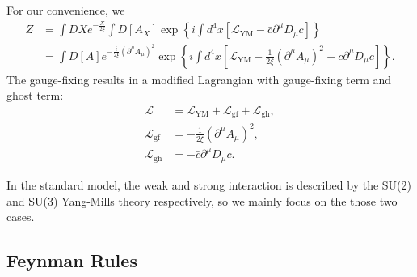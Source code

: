 \documentclass[aps,prb,superscriptaddress,nofootinbib]{revtex4}
\begin{document}
For our convenience, we 
\begin{equation}
\begin{aligned}
	Z &= \int DX e^{-\frac{X}{2 \xi}}\int D[A_X] \exp\left\{i\int d^4x \left[\mathcal{L}_{\mathrm{YM}} - \bar c\partial^\mu D_\mu c \right]\right\} \\
	&= \int D[A] e^{-\frac{i}{2\xi}(\partial^\mu A_\mu)^2} \exp\left\{i\int d^4x \left[\mathcal{L}_{\mathrm{YM}} -\frac{1}{2\xi}(\partial^\mu A_\mu)^2 - \bar c\partial^\mu D_\mu c \right]\right\}.
\end{aligned}
\end{equation}
The gauge-fixing results in a modified Lagrangian with gauge-fixing term and ghost term:
\begin{equation}
\begin{aligned}
	\mathcal L &= \mathcal{L}_{\mathrm{YM}} + \mathcal{L}_{\mathrm{gf}} + \mathcal{L}_{\mathrm{gh}}, \\
	\mathcal{L}_{\mathrm{gf}} &= -\frac{1}{2\xi}(\partial^\mu A_\mu)^2, \\
	\mathcal{L}_{\mathrm{gh}} &= -\bar c\partial^\mu D_\mu c.
\end{aligned}
\end{equation}

In the standard model, the weak and strong interaction is described by the SU(2) and SU(3) Yang-Mills theory respectively, so we mainly focus on the those two cases.


\subsection{Feynman Rules}
\end{document}
